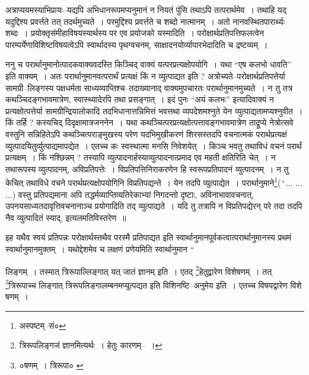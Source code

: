 \documentclass[article,12pt,a4paper]{memoir}
\newcommand{\add}[1]{($^{+}$#1)}
\begin{document}
	  \pstart अत्राप्ययमस्याभिप्रायः--यद्यपि अभिधानरूपमप्यनुमानं न नियतं पुंसि तथाऽपि तत्परार्थमेव । तथाहि यद् यदुद्दिश्य प्रवर्त्तते तत् तदर्थमुच्यते । परमुद्दिश्य प्रवर्त्तते च शब्दो नात्मानम् । अतो नानवस्थितपारार्थ्यः शब्दः । प्रयोक्तृसंमीहाविषयस्यार्थस्य पर एव प्रयोजको यस्मादिति । परोक्षार्थप्रतिपत्तिफलत्वेन पारम्पर्येणाविशिष्टविषयत्वेऽपि स्वार्थादस्य पृथग्वचनम्, साक्षादनयोर्व्यापारभेदादिति च द्रष्टव्यम् ।
	\pend
      

	  \pstart ननु च परार्थानुमानोत्पादकवाक्यवदस्ति किञ्चिद् वाक्यं यत्परप्रत्यक्षोपयोगि । यथा “एष कलभो धावति” इति वाक्यम् । अतः परार्थानुमानवत्परार्थं प्रत्यक्षं किं न व्युत्पाद्यत इति ? अत्रोच्यते--परोक्षार्थप्रतिपत्तेर्या सामग्री--लिङ्गस्य पक्षधर्मता साध्यव्याप्तिश्च--तदाख्यानाद् वाक्यमुपचारतः परार्थानुमानमुच्यते । न तु तत्र कथञ्चिदङ्गभावमात्रेण, स्वास्थ्यादेरपि तथा प्रसङ्गात् । इदं पुनः “अयं कलभः” इत्यादिवाक्यं न प्रत्यक्षोत्पत्तेर्या सामग्रीन्द्रियालोकादि तदभिधानात्तन्निमित्तं भवत्तथा व्यपदेशमश्नुते येन व्युत्पाद्यतामप्यश्नुवीत । किं तर्हि ? कस्यचिद् दिदृक्षामात्रजननेन । यथा कथञ्चित्परप्रत्यक्षोत्पत्तावङ्गभावमात्रेण ताद्रूप्ये नेत्रोत्सवे वस्तुनि सन्निहितेऽपि कथञ्चित्पराङ्मुखस्य परेण यदभिमुखीकरणं \leavevmode{} शिरसस्तदपि वचनात्मकं परार्थप्रत्यक्षं व्युत्पादयितुर्व्युत्पाद्यमापद्येत । एतच्च कः स्वस्थात्मा मनसि निवेशयेत् । किञ्च भवतु तथाविधं वचनं परार्थं प्रत्यक्षम् । किं नश्छिन्नम् ? तस्यापि व्युत्पादनार्हस्याव्युत्पादनात्प्रमाद एव महती क्षतिरिति चेत् । न तथारूपस्य व्युत्पादनम्, अविप्रतिपत्तेः । विप्रतिपत्तिनिराकरणेन हि स्वरूपप्रतिपादनं व्युत्पादनम् । न तु केचित् तथाविधे वचने परार्थप्रत्यक्षोपयोगिनि विप्रतिपद्यन्ते । येन तदपि व्युत्पाद्येत । परार्थानुमाने\footnote{अस्पष्टम्--सं०}\add{... ... ...} वस्तु प्रतिपद्यमाना अपि तद्धर्मव्याप्तिव्यतिरेकाभ्यां निगदन्तो दृष्टाः, अविनाभावावचनात्, उपनयसाध्यतदावृत्तिवचनानाञ्च प्रयोगादिति तद् व्युत्पाद्यते । यदि तु तत्रापि न विप्रतिपद्येरन् परे तदा तदपि नैव व्युत्पादितं स्याद्, इत्यलमतिविस्तरेण ॥
	\pend
      

	  \pstart इह यथैव स्वयं प्रतिपन्नः परोक्षार्थस्तथैव परस्मै प्रतिपाद्यत इति स्वार्थानुमानपूर्वकत्वात्परार्थानुमानस्य प्रथमं स्वार्थानुमानमुक्तम् । यथोद्देशमेव च लक्षणं प्रणेयमिति स्वार्थानुमान  \leavevmode{} “
	  
	लिङ्गम् । तस्मात् त्रिरूपाल्लिङ्गात् यत् जातं ज्ञानम् इति । एतद् \footnote{त्रिरूपलिङ्गजं ज्ञानमित्यर्थः । हेतुः कारणम्--\cite{dp-msD-n} ।}हेतुद्वारेण विशेषणम् । तत् \footnote{०षणम् । त्रिरूपा० \cite{dp-msC} \cite{dp-msD}}त्रिरूपाच्च लिङ्गात् त्रिरूपलिङ्गालम्बनमप्युत्पद्यत इति विशिनष्टि--अनुमेय इति । एतच्च विषयद्वारेण विशे षणम् । 
	  
\end{document}
